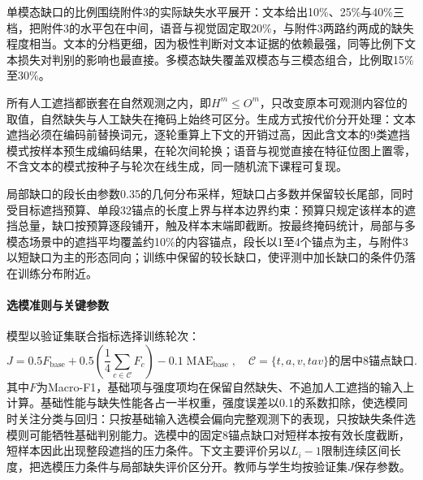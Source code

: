 单模态缺口的比例围绕附件3的实际缺失水平展开：文本给出10\%、25\%与40\%三档，把附件3的水平包在中间，语音与视觉固定取20\%，与附件3两路约两成的缺失程度相当。文本的分档更细，因为极性判断对文本证据的依赖最强，同等比例下文本损失对判别的影响也最直接。多模态缺失覆盖双模态与三模态组合，比例取15\%至30\%。

所有人工遮挡都嵌套在自然观测之内，即$H^m\le O^m$，只改变原本可观测内容位的取值，自然缺失与人工缺失在掩码上始终可区分。生成方式按代价分开处理：文本遮挡必须在编码前替换词元，逐轮重算上下文的开销过高，因此含文本的9类遮挡模式按样本预生成编码结果，在轮次间轮换；语音与视觉直接在特征位图上置零，不含文本的模式按种子与轮次在线生成，同一随机流下课程可复现。

局部缺口的段长由参数0.35的几何分布采样，短缺口占多数并保留较长尾部，同时受目标遮挡预算、单段32锚点的长度上界与样本边界约束：预算只规定该样本的遮挡总量，缺口按预算逐段铺开，触及样本末端即截断。按最终掩码统计，局部与多模态场景中的遮挡平均覆盖约10\%的内容锚点，段长以1至4个锚点为主，与附件3以短缺口为主的形态同向；训练中保留的较长缺口，使评测中加长缺口的条件仍落在训练分布附近。

\paragraph{选模准则与关键参数}
模型以验证集联合指标选择训练轮次：
\begin{equation}
\label{q2:eq:sel}
J=0.5F_{\mathrm{base}}+0.5\left(\frac14\sum_{c\in\mathcal C}F_c\right)
-0.1\operatorname{MAE}_{\mathrm{base}},\quad
\mathcal C=\{t,a,v,tav\}\text{的居中8锚点缺口}.
\end{equation}
其中$F$为Macro-F1，基础项与强度项均在保留自然缺失、不追加人工遮挡的输入上计算。基础性能与缺失性能各占一半权重，强度误差以0.1的系数扣除，使选模同时关注分类与回归：只按基础输入选模会偏向完整观测下的表现，只按缺失条件选模则可能牺牲基础判别能力。选模中的固定8锚点缺口对短样本按有效长度截断，短样本因此出现整段遮挡的压力条件。下文主要评价另以$L_i-1$限制连续区间长度，把选模压力条件与局部缺失评价区分开。教师与学生均按验证集$J$保存参数。

